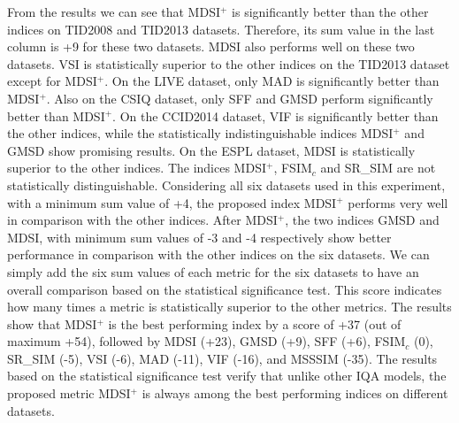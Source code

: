 From the results we can see that MDSI$^+$ is significantly better than the other indices on TID2008 and TID2013 datasets. Therefore, its sum value in the last column is +9 for these two datasets. MDSI also performs well on these two datasets. VSI is statistically superior to the other indices on the TID2013 dataset except for MDSI$^+$. On the LIVE dataset, only MAD is significantly better than MDSI$^+$. Also on the CSIQ dataset, only SFF and GMSD perform significantly better than MDSI$^+$. On the CCID2014 dataset, VIF is significantly better than the other indices, while the statistically indistinguishable indices MDSI$^+$ and GMSD show promising results. On the ESPL dataset, MDSI is statistically superior to the other indices. The indices MDSI$^+$, FSIM$_c$ and SR\_SIM are not statistically distinguishable. Considering all six datasets used in this experiment, with a minimum sum value of +4, the proposed index MDSI$^+$ performs very well in comparison with the other indices. After MDSI$^+$, the two indices GMSD and MDSI, with minimum sum values of -3 and -4 respectively show better performance in comparison with the other indices on the six datasets. We can simply add the six sum values of each metric for the six datasets to have an overall comparison based on the statistical significance test. This score indicates how many times a metric is statistically superior to the other metrics. The results show that MDSI$^+$ is the best performing index by a score of +37 (out of maximum +54), followed by MDSI (+23), GMSD (+9), SFF (+6), FSIM$_c$ (0), SR\_SIM (-5), VSI (-6), MAD (-11), VIF (-16), and MSSSIM (-35). The results based on the statistical significance test verify that unlike other IQA models, the proposed metric MDSI$^+$ is always among the best performing indices on different datasets.                        










